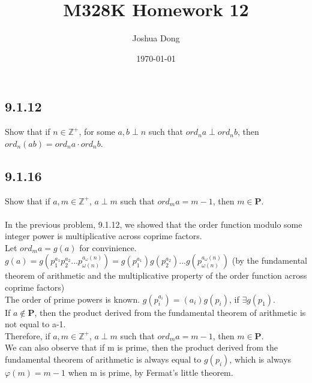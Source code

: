 \documentclass{article}
\begin{document}
\title{M328K\: Homework 12}
\author{Joshua Dong}
\date{\today}
\maketitle

\subsection{9.1.12}
Show that if $n \in \mathbb{Z}^+$, for some $a, b \perp n$ such that
$ord_n a \perp ord_n b$, then $ord_n (ab) = ord_n a \cdot ord_n b$.
\\

\subsection{9.1.16}
Show that if $a, m \in \mathbb{Z}^+$, $a \perp m$ such that
$ord_m a = m-1$, then $m \in \textbf{P}$.
\\
\\In the previous problem, 9.1.12, we showed that the order function modulo some integer power is multiplicative across coprime factors.
\\Let $ord_m a = g(a)$ for convinience.
\\$g(a) = g(p_1^{a_1}p_2^{a_2}...p_{\omega(n)}^{a_\omega(n)}) = g(p_1^{a_1})g(p_2^{a_2})...g(p_{\omega(n)}^{a_\omega(n)})$ (by the fundamental theorem of arithmetic and the multiplicative property of the order function across coprime factors)
\\The order of prime powers is known. $g(p_i^{a_i}) = (a_i)g(p_i)$, if $\exists g(p_1)$.
\\If $a \notin \textbf{P}$, then the product derived from the fundamental theorem of arithmetic is not equal to a-1.
\\Therefore, if $a, m \in \mathbb{Z}^+$, $a \perp m$ such that $ord_m a = m-1$, then $m \in \textbf{P}$.
\\We can also observe that if m is prime, then the product derived from the fundamental theorem of arithmetic is always equal to $g(p_i)$, which is always $\varphi(m) = m-1$ when m is prime, by Fermat's little theorem.
\end{document}
